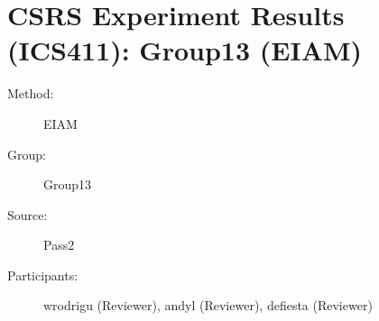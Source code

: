 \chapter {CSRS Experiment Results (ICS411): Group13 (EIAM)}
\small
	  

\begin{description}
\item [Method:] EIAM
\item [Group:] Group13
\item [Source:] Pass2
\item [Participants:] wrodrigu (Reviewer), andyl (Reviewer), defiesta (Reviewer)
\end{description}
